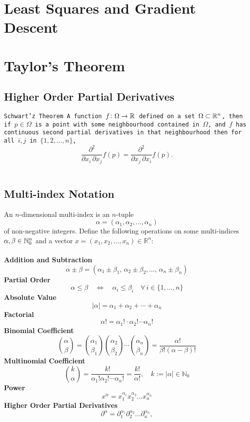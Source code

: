 \documentclass[11pt,a4paper]{article}
\begin{document}
	\newpage
	
	\section{Least Squares and Gradient Descent}
	
	\newpage
	
	\section{Taylor's Theorem}
	\subsection{Higher Order Partial Derivatives}
	\begin{theorem}
		\tt{Schwart'z Theorem}
		A function $f \colon \Omega \to \mathbb{R}$ defined
		on a set $\Omega \subset \mathbb{R}^n$, then if $p \in \Omega$ is a point
		with some neighbourhood contained in $\Omega$, and $f$ has continuous
		second partial derivatives in that neighbourhood then for all $i,j$
		in $\{1,2,\dots,n\}$,
		\[
			{\frac {\partial ^{2}}{\partial x_{i}\,
			\partial x_{j}}}f({p})={\frac {\partial ^{2}}{\partial x_{j}\,
			\partial x_{i}}}f({p}).
		\]
	\end{theorem}
	
	\subsection{Multi-index Notation}
	An $n$-dimensional multi-index is an $n$-tuple
  \[
    \alpha = (\alpha_{1},\alpha_{2},\ldots,\alpha_{n})
  \]
	of non-negative integers. Define the following operations on some
	multi-indices $\alpha ,\beta \in \mathbb{N}_{0}^{n}$ and a vector
	$x=(x_{1},x_{2},\ldots ,x_{n})\in \mathbb {R} ^{n}$: \\
  \phantom{} \\
	\textbf{Addition and Subtraction}
	\[
		\alpha \pm \beta =
		(\alpha _{1}\pm \beta _{1},\,\alpha _{2}\pm 
		\beta _{2},\ldots ,\,\alpha _{n}\pm \beta _{n})
	\]
	\textbf{Partial Order}
	\[
		\alpha \leq \beta \quad \Leftrightarrow \quad 
		\alpha _{i}\leq \beta _{i}\quad \forall \,i\in \{1,\ldots ,n\}
	\]
	\textbf{Absolute Value}
	\[
		|\alpha |=\alpha _{1}+\alpha _{2}+\cdots +\alpha _{n}
	\]
	\textbf{Factorial}
	\[
		\alpha !=\alpha _{1}!\cdot \alpha _{2}!\cdots \alpha _{n}!
	\]
	\textbf{Binomial Coefficient}
	\[
		{\binom {\alpha}{\beta}} = 
		{\binom {\alpha_{1}}{\beta_{1}}}
		{\binom {\alpha_{2}}{\beta_{2}}}\cdots 
		{\binom {\alpha_{n}}{\beta_{n}}} = 
		{\frac {\alpha!}{\beta! (\alpha-\beta)!}}
	\]
	\textbf{Multinomial Coefficient}
	\[
		{\binom {k}{\alpha}} = 
		{\frac {k!}{\alpha_{1}!\alpha_{2}! \cdots \alpha_{n}!}} = 
		{\frac {k!}{\alpha!}}, 
		\quad k:=|\alpha |\in \mathbb {N}_{0}
	\]
	\textbf{Power}
	\[
		x^{\alpha} = 
		x_{1}^{\alpha_{1}}x_{2}^{\alpha_{2}}\ldots x_{n}^{\alpha_{n}}
	\]
	\textbf{Higher Order Partial Derivatives}
	\[
		\partial^{\alpha} = 
		\partial_{1}^{\alpha _{1}}
		\partial _{2}^{\alpha _{2}} \ldots 
		\partial _{n}^{\alpha _{n}},
	\]
\end{document}
